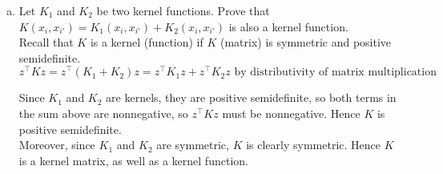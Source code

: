 \documentclass[11pt]{article}
\begin{document}
\begin{enumerate}[(c)]
\item Let $K_1$ and $K_2$ be two kernel functions. Prove that $K(x_i,x_{i'}) = K_1(x_i,x_{i'}) + K_2(x_i,x_{i'})$ is also a kernel function.\\

Recall that $K$ is a kernel (function) if $K$ (matrix) is symmetric and positive semidefinite.
	\begin{equation*}
		z^\top K z = z^\top (K_1 + K_2) z = z^\top K_1 z + z^\top K_2 z  \text{	by distributivity of matrix multiplication}
	\end{equation*}
	
Since $K_1$ and $K_2$ are kernels, they are positive semidefinite, so both terms in the sum above are nonnegative, so $z^\top K z$ must be nonnegative. Hence $K$ is positive semidefinite.\\
Moreover, since $K_1$ and $K_2$ are symmetric, $K$ is clearly symmetric. Hence $K$ is a kernel matrix, as well as a kernel function. 

\end{enumerate}
\end{document}
